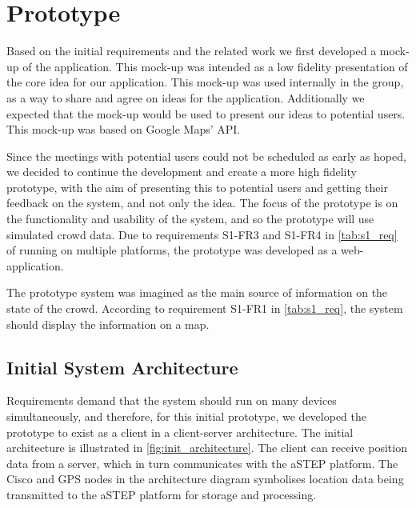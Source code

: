 \section{Prototype} \label{sec:s1_prototype}
Based on the initial requirements and the related work we first developed a mock-up of the application. This mock-up was intended as a low fidelity presentation of the core idea for our application. This mock-up was used internally in the group, as a way to share and agree on ideas for the application. Additionally we expected that the mock-up would be used to present our ideas to potential users. This mock-up was based on Google Maps' API.

Since the meetings with potential users could not be scheduled as early as hoped, we decided to continue the development and create a more high fidelity prototype, with the aim of presenting this to potential users and getting their feedback on the system, and not only the idea. The focus of the prototype is on the functionality and usability of the system, and so the prototype will use simulated crowd data. Due to requirements S1-FR3 and S1-FR4 in \cref{tab:s1_req} of running on multiple platforms, the prototype was developed as a web-application.

The prototype system was imagined as the main source of information on the state of the crowd. According to requirement S1-FR1 in \cref{tab:s1_req}, the system should display the information on a map.


\subsection{Initial System Architecture}
Requirements demand that the system should run on many devices simultaneously, and therefore, for this initial prototype, we developed the prototype to exist as a client in a client-server architecture. The initial architecture is illustrated in \cref{fig:init_architecture}. The client can receive position data from a server, which in turn communicates with the aSTEP platform. The Cisco and GPS nodes in the architecture diagram symbolises location data being transmitted to the aSTEP platform for storage and processing.

